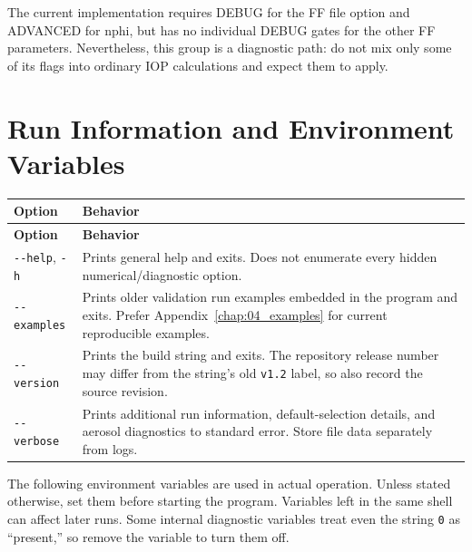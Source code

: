 The current implementation requires DEBUG for the FF file option and ADVANCED for nphi, but has no individual DEBUG gates for the other FF parameters. Nevertheless, this group is a diagnostic path: do not mix only some of its flags into ordinary IOP calculations and expect them to apply.

\section{Run Information and Environment Variables}
\label{sec:auto:03_options:10}

{\TableFont
\begin{longtable}{@{}>{\raggedright\arraybackslash}p{}>{\raggedright\arraybackslash}p{}@{}}
\toprule
\textbf{Option} & \textbf{Behavior} \\
\midrule
\endfirsthead
\toprule
\textbf{Option} & \textbf{Behavior} \\
\midrule
\endhead
\bottomrule
\endfoot
\texttt{-\allowbreak{}-\allowbreak{}help}, \texttt{-\allowbreak{}h} & Prints general help and exits. Does not enumerate every hidden numerical/diagnostic option. \\
\texttt{-\allowbreak{}-\allowbreak{}examples} & Prints older validation run examples embedded in the program and exits. Prefer Appendix~\ref{chap:04_examples} for current reproducible examples. \\
\texttt{-\allowbreak{}-\allowbreak{}version} & Prints the build string and exits. The repository release number may differ from the string's old \texttt{v1.\allowbreak{}2} label, so also record the source revision. \\
\texttt{-\allowbreak{}-\allowbreak{}verbose} & Prints additional run information, default-selection details, and aerosol diagnostics to standard error. Store file data separately from logs. \\
\end{longtable}
}

The following environment variables are used in actual operation. Unless stated otherwise, set them before starting the program. Variables left in the same shell can affect later runs. Some internal diagnostic variables treat even the string \texttt{0} as “present,” so remove the variable to turn them off.


